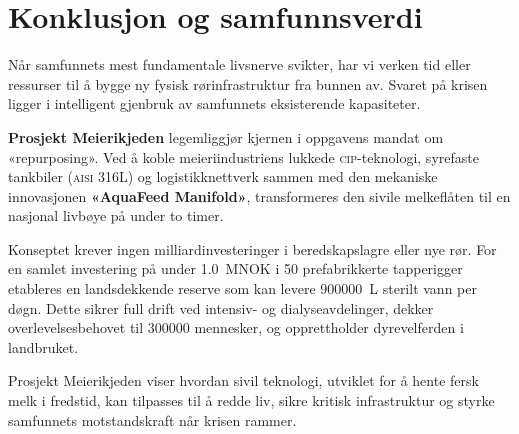 \section{Konklusjon og samfunnsverdi}
\label{sec:konklusjon}

Når samfunnets mest fundamentale livsnerve svikter, har vi verken tid eller ressurser til å bygge ny fysisk rørinfrastruktur fra bunnen av. Svaret på krisen ligger i intelligent gjenbruk av samfunnets eksisterende kapasiteter.

\textbf{Prosjekt Meierikjeden} legemliggjør kjernen i oppgavens mandat om «repurposing». Ved å koble meieriindustriens lukkede \textsc{cip}-teknologi, syrefaste tankbiler (\textsc{aisi} 316L) og logistikknettverk sammen med den mekaniske innovasjonen \textbf{«AquaFeed Manifold»}, transformeres den sivile melkeflåten til en nasjonal livbøye på under to timer.

Konseptet krever ingen milliardinvesteringer i beredskapslagre eller nye rør. For en samlet investering på under \SI{1.0}{MNOK} i 50 prefabrikkerte tapperigger etableres en landsdekkende reserve som kan levere \SI{900000}{\liter} sterilt vann per døgn. Dette sikrer full drift ved intensiv- og dialyseavdelinger, dekker overlevelsesbehovet til \num{300000} mennesker, og opprettholder dyrevelferden i landbruket.

Prosjekt Meierikjeden viser hvordan sivil teknologi, utviklet for å hente fersk melk i fredstid, kan tilpasses til å redde liv, sikre kritisk infrastruktur og styrke samfunnets motstandskraft når krisen rammer.
